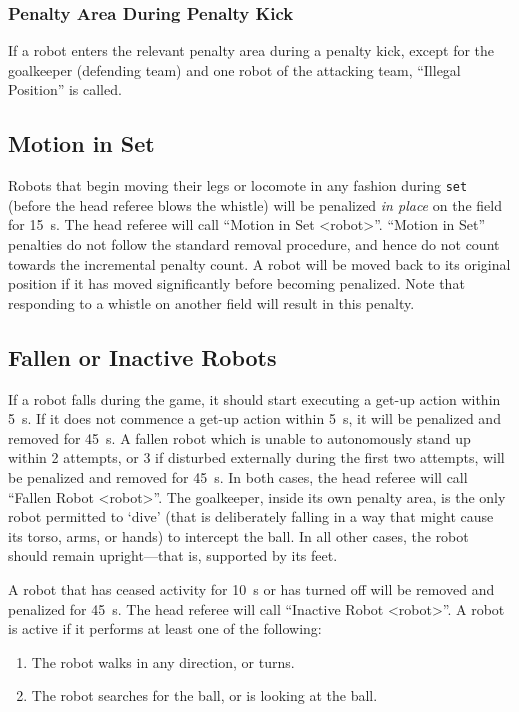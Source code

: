 \subsubsection{Penalty Area During Penalty Kick}
\label{sec:ip_penalty_kick}

If a robot enters the relevant penalty area during a penalty kick, except for the goalkeeper (defending team) and one robot of the attacking team, ``Illegal Position'' is called.

\subsection{Motion in Set}
\label{sec:motion_in_set}

Robots that begin moving their legs or locomote in any fashion during \texttt{set} (\ie before the head referee blows the whistle) will be penalized \textit{in place} on the field for \qty{15}{\second}.
The head referee will call ``Motion in Set \textless robot\textgreater''.
``Motion in Set'' penalties do not follow the standard removal procedure, and hence do not count towards the incremental penalty count.
A robot will be moved back to its original position if it has moved significantly before becoming penalized.
Note that responding to a whistle on another field will result in this penalty.

\subsection{Fallen or Inactive Robots}
\label{sec:fallenrobots}

If a robot falls during the game, it should start executing a get-up action within \qty{5}{\second}.
If it does not commence a get-up action within \qty{5}{\second}, it will be penalized and removed for \qty{45}{\second}.
A fallen robot which is unable to autonomously stand up within 2 attempts, or 3 if disturbed externally during the first two attempts, will be penalized and removed for \qty{45}{\second}.
In both cases, the head referee will call ``Fallen Robot  \textless robot\textgreater''.
The goalkeeper, inside its own penalty area, is the only robot permitted to `dive' (that is deliberately falling in a way that might cause its torso, arms, or hands) to intercept the ball.
In all other cases, the robot should remain upright---that is, supported by its feet.

A robot that has ceased activity for \qty{10}{\second} or has turned off will be removed and penalized for \qty{45}{\second}.
The head referee will call ``Inactive Robot \textless robot\textgreater''.
A robot is active if it performs at least one of the following:
\begin{enumerate}
  \item The robot walks in any direction, or turns.
  \item The robot searches for the ball, or is looking at the ball.
\end{enumerate}

